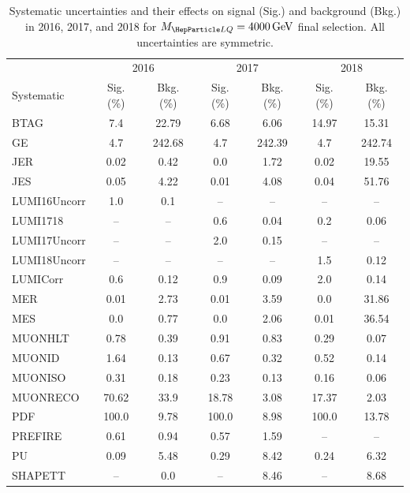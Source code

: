 \begin{table}[H]
	\begin{center}
        \begin{footnotesize}
			\caption{Systematic uncertainties and their effects on signal (Sig.) and background (Bkg.) in 2016, 2017, and 2018 for $\MLQ = \SI{4000}{GeV}$ final selection. All uncertainties are symmetric.}
			\begin{tabular}{lcccccc} \hline \hline
				& \multicolumn{2}{c}{2016} & \multicolumn{2}{c}{2017} & \multicolumn{2}{c}{2018} \\
				Systematic & Sig. (\%) & Bkg. (\%) & Sig. (\%) & Bkg. (\%) & Sig. (\%) & Bkg. (\%) \\ \hline
				BTAG &  7.4  &  22.79 &  6.68  &  6.06 &  14.97  &  15.31 \\
				GE &  4.7  &  242.68 &  4.7  &  242.39 &  4.7  &  242.74 \\
				JER &  0.02  &  0.42 &  0.0  &  1.72 &  0.02  &  19.55 \\
				JES &  0.05  &  4.22 &  0.01  &  4.08 &  0.04  &  51.76 \\
				LUMI16Uncorr &  1.0  &  0.1 & -- & -- & -- & -- \\
				LUMI1718 & -- & -- &  0.6  &  0.04 &  0.2  &  0.06 \\
				LUMI17Uncorr & -- & -- &  2.0  &  0.15 & -- & -- \\
				LUMI18Uncorr & -- & -- & -- & -- &  1.5  &  0.12 \\
				LUMICorr &  0.6  &  0.12 &  0.9  &  0.09 &  2.0  &  0.14 \\
				MER &  0.01  &  2.73 &  0.01  &  3.59 &  0.0  &  31.86 \\
				MES &  0.0  &  0.77 &  0.0  &  2.06 &  0.01  &  36.54 \\
				MUONHLT &  0.78  &  0.39 &  0.91  &  0.83 &  0.29  &  0.07 \\
				MUONID &  1.64  &  0.13 &  0.67  &  0.32 &  0.52  &  0.14 \\
				MUONISO &  0.31  &  0.18 &  0.23  &  0.13 &  0.16  &  0.06 \\
				MUONRECO &  70.62  &  33.9 &  18.78  &  3.08 &  17.37  &  2.03 \\
				PDF &  100.0  &  9.78 &  100.0  &  8.98 &  100.0  &  13.78 \\
				PREFIRE &  0.61  &  0.94 &  0.57  &  1.59 & -- & -- \\
				PU &  0.09  &  5.48 &  0.29  &  8.42 &  0.24  &  6.32 \\
				SHAPETT & -- &  0.0 & -- &  8.46 & -- &  8.68 \\

\end{tabular}
\end{footnotesize}
\end{center}
\end{table}
